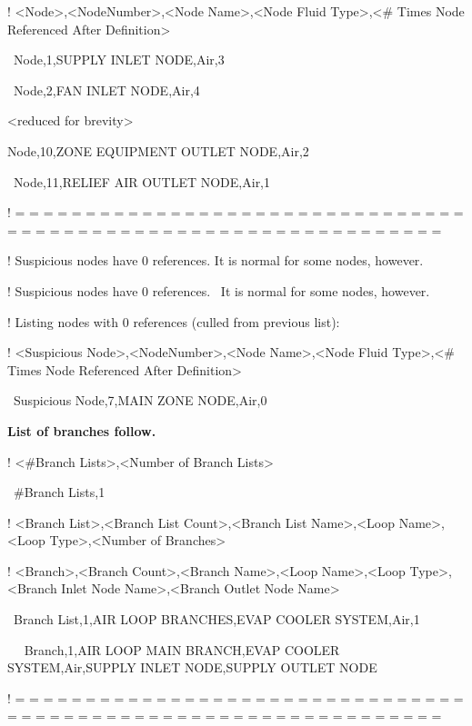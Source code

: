 ! \textless{}Node\textgreater{},\textless{}NodeNumber\textgreater{},\textless{}Node Name\textgreater{},\textless{}Node Fluid Type\textgreater{},\textless{}\# Times Node Referenced After Definition\textgreater{}

~Node,1,SUPPLY INLET NODE,Air,3

~Node,2,FAN INLET NODE,Air,4

\textless{}reduced for brevity\textgreater{}

Node,10,ZONE EQUIPMENT OUTLET NODE,Air,2

~Node,11,RELIEF AIR OUTLET NODE,Air,1

! = = = = = = = = = = = = = = = = = = = = = = = = = = = = = = = = = = = = = = = = = = = = = = = = = = = = = = = = = = = = = = =

! Suspicious nodes have 0 references. It is normal for some nodes, however.

! Suspicious nodes have 0 references.~ It is normal for some nodes, however.

! Listing nodes with 0 references (culled from previous list):

! \textless{}Suspicious Node\textgreater{},\textless{}NodeNumber\textgreater{},\textless{}Node Name\textgreater{},\textless{}Node Fluid Type\textgreater{},\textless{}\# Times Node Referenced After Definition\textgreater{}

~Suspicious Node,7,MAIN ZONE NODE,Air,0

\textbf{List of branches follow.}

! \textless{}\#Branch Lists\textgreater{},\textless{}Number of Branch Lists\textgreater{}

~\#Branch Lists,1

! \textless{}Branch List\textgreater{},\textless{}Branch List Count\textgreater{},\textless{}Branch List Name\textgreater{},\textless{}Loop Name\textgreater{},\textless{}Loop Type\textgreater{},\textless{}Number of Branches\textgreater{}

! \textless{}Branch\textgreater{},\textless{}Branch Count\textgreater{},\textless{}Branch Name\textgreater{},\textless{}Loop Name\textgreater{},\textless{}Loop Type\textgreater{},\textless{}Branch Inlet Node Name\textgreater{},\textless{}Branch Outlet Node Name\textgreater{}

~Branch List,1,AIR LOOP BRANCHES,EVAP COOLER SYSTEM,Air,1

~~ Branch,1,AIR LOOP MAIN BRANCH,EVAP COOLER SYSTEM,Air,SUPPLY INLET NODE,SUPPLY OUTLET NODE

! = = = = = = = = = = = = = = = = = = = = = = = = = = = = = = = = = = = = = = = = = = = = = = = = = = = = = = = = = = = = = = =


